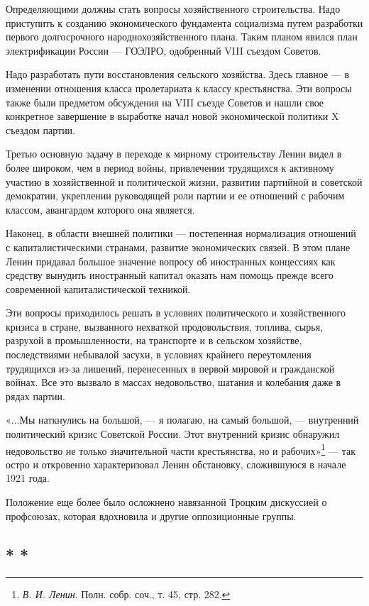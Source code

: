\documentclass[12pt, a4paper, openany]{book}
\begin{document}
Определяющими должны стать вопросы хозяйственного строительства. Надо приступить к созданию экономического фундамента социализма путем разработки первого долгосрочного народнохозяйственного плана. Таким планом явился план электрификации России — ГОЭЛРО, одобренный VIII съездом Советов.

Надо разработать пути восстановления сельского хозяйства. Здесь главное — в изменении отношения класса пролетариата к классу крестьянства. Эти вопросы также были предметом обсуждения на VIII съезде Советов и нашли свое конкретное завершение в выработке начал новой экономической политики X съездом партии.

Третью основную задачу в переходе к мирному строительству Ленин видел в более широком, чем в период войны, привлечении трудящихся к активному участию в хозяйственной и политической жизни, развитии партийной и советской демократии, укреплении руководящей роли партии и ее отношений с рабочим классом, авангардом которого она является.

Наконец, в области внешней политики — постепенная нормализация отношений с капиталистическими странами, развитие экономических связей. В этом плане Ленин придавал большое значение вопросу об иностранных концессиях как средству вынудить иностранный капитал оказать нам помощь прежде всего современной капиталистической техникой.

Эти вопросы приходилось решать в условиях политического и хозяйственного кризиса в стране, вызванного нехваткой продовольствия, топлива, сырья, разрухой в промышленности, на транспорте и в сельском хозяйстве, последствиями небывалой засухи, в условиях крайнего переутомления трудящихся из-за лишений, перенесенных в первой мировой и гражданской войнах. Все это вызвало в массах недовольство, шатания и колебания даже в рядах партии.

«...Мы наткнулись на большой, — я полагаю, на самый большой, — внутренний политический кризис Советской России. Этот внутренний кризис обнаружил недовольство не только значительной части крестьянства, но и рабочих»\footnote{\textit{В. И. Ленин}. Полн. собр. соч., т. 45, стр. 282.} — так остро и откровенно характеризовал Ленин обстановку, сложившуюся в начале 1921 года.

Положение еще более было осложнено навязанной Троцким дискуссией о профсоюзах, которая вдохновила и другие оппозиционные группы.

\subsection*{\center * * *}
\end{document}
